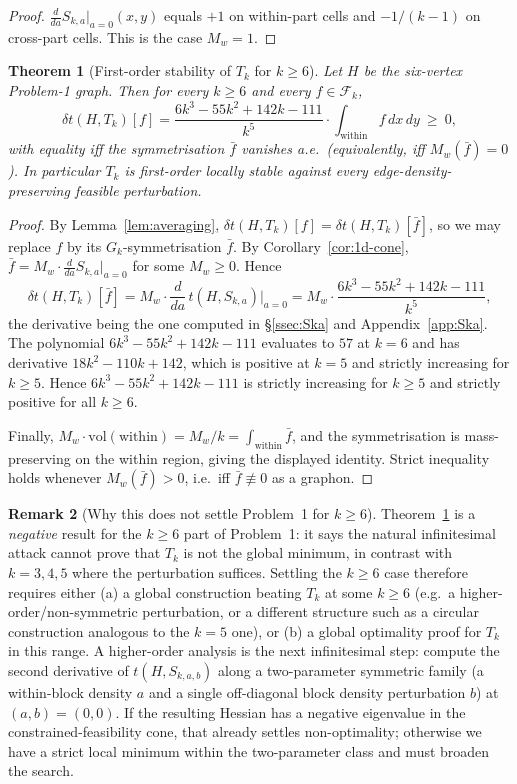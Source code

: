 \documentclass[11pt]{amsart}
\newtheorem{theorem}{Theorem}[section]
\theoremstyle{definition}
\newtheorem{remark}[theorem]{Remark}
\newcommand{\1}{\mathbf 1}
\newcommand{\dd}{\,d}
\begin{document}
\begin{proof}
$\frac{d}{da}S_{k,a}|_{a=0}(x,y)$ equals $+1$ on within-part cells and
$-1/(k-1)$ on cross-part cells.  This is the case $M_w=1$.
\end{proof}

\begin{theorem}[First-order stability of $T_k$ for $k\ge 6$]
\label{thm:first-order-stability}
Let $H$ be the six-vertex Problem-1 graph.  Then for every $k\ge 6$ and every
$f\in\mathcal F_k$,
\[
   \delta t(H,T_k)[f]
   = \frac{6k^3-55k^2+142k-111}{k^5}\cdot
   \int_{\mathrm{within}} f \dd x\dd y
   \ \ge\ 0,
\]
with equality iff the symmetrisation $\bar f$ vanishes a.e.\ (equivalently, iff
$M_w(\bar f) = 0$).  In particular $T_k$ is first-order locally stable against
every edge-density-preserving feasible perturbation.
\end{theorem}

\begin{proof}
By Lemma~\ref{lem:averaging}, $\delta t(H,T_k)[f] = \delta t(H,T_k)[\bar f]$, so
we may replace $f$ by its $G_k$-symmetrisation $\bar f$.  By
Corollary~\ref{cor:1d-cone}, $\bar f = M_w\cdot \frac{d}{da}S_{k,a}|_{a=0}$ for
some $M_w\ge 0$.  Hence
\[
   \delta t(H,T_k)[\bar f]
   = M_w\cdot \frac{d}{da}\,t(H,S_{k,a})\Big|_{a=0}
   = M_w\cdot \frac{6k^3-55k^2+142k-111}{k^5},
\]
the derivative being the one computed in \S\ref{ssec:Ska} and
Appendix~\ref{app:Ska}.  The polynomial $6k^3-55k^2+142k-111$ evaluates to $57$
at $k=6$ and has derivative $18k^2-110k+142$, which is positive at $k=5$ and
strictly increasing for $k\ge 5$.  Hence $6k^3-55k^2+142k-111$ is strictly
increasing for $k\ge 5$ and strictly positive for all $k\ge 6$.

Finally, $M_w\cdot \mathrm{vol}(\mathrm{within}) = M_w/k =
\int_{\mathrm{within}}\bar f$, and the symmetrisation is mass-preserving on the
within region, giving the displayed identity.  Strict inequality holds whenever
$M_w(\bar f)>0$, i.e.\ iff $\bar f\not\equiv 0$ as a graphon.
\end{proof}

\begin{remark}[Why this does not settle Problem~1 for $k\ge 6$]
Theorem~\ref{thm:first-order-stability} is a \emph{negative} result for the
$k\ge 6$ part of Problem~1: it says the natural infinitesimal attack cannot
prove that $T_k$ is not the global minimum, in contrast with $k=3,4,5$ where the
perturbation suffices.  Settling the $k\ge 6$ case therefore requires either
(a) a global construction beating $T_k$ at some $k\ge 6$ (e.g.\ a
higher-order/non-symmetric perturbation, or a different structure such as a
circular construction analogous to the $k=5$ one), or (b) a global optimality
proof for $T_k$ in this range.  A higher-order analysis is the next infinitesimal
step: compute the second derivative of $t(H, S_{k,a,b})$ along a two-parameter
symmetric family (a within-block density $a$ and a single off-diagonal block
density perturbation $b$) at $(a,b)=(0,0)$.  If the resulting Hessian has a
negative eigenvalue in the constrained-feasibility cone, that already settles
non-optimality; otherwise we have a strict local minimum within the
two-parameter class and must broaden the search.
\end{remark}
\end{document}

